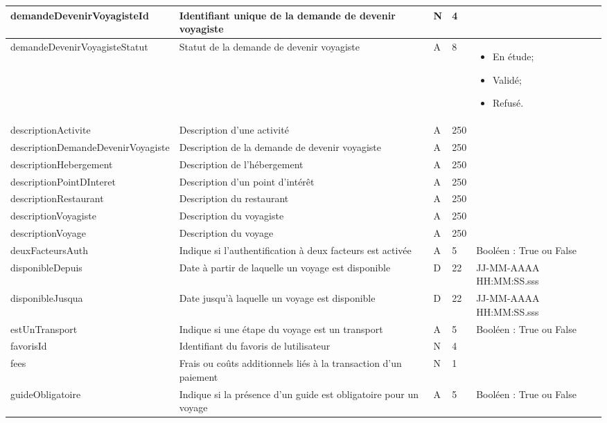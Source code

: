 \documentclass[12pt]{report}
\begin{document}
\begin{longtable}{|p{4cm}|p{4cm}|p{1cm}|p{1cm}|p{4cm}|}
				\hline
				demandeDevenirVoyagisteId & Identifiant unique de la demande de devenir voyagiste & N & 4 & \\						
				\hline
				demandeDevenirVoyagisteStatut & Statut de la demande de devenir voyagiste & A & 8 & \begin{itemize} \item En étude; \item Validé; \item Refusé. \end{itemize} \\						
				\hline
				descriptionActivite & Description d'une activité & A & 250 & \\						
				\hline
				descriptionDemandeDevenirVoyagiste & Description de la demande de devenir voyagiste & A & 250 & \\						
				\hline
				descriptionHebergement & Description de l'hébergement & A & 250 & \\						
				\hline
				descriptionPointDInteret & Description d'un point d'intérêt & A & 250 & \\						
				\hline
				descriptionRestaurant & Description du restaurant & A & 250 & \\						
				\hline
				descriptionVoyagiste & Description du voyagiste & A & 250 & \\						
				\hline
				descriptionVoyage & Description du voyage & A & 250 & \\						
				\hline
				deuxFacteursAuth & Indique si l'authentification à deux facteurs est activée & A & 5 & Booléen : True ou False \\						
				\hline
				disponibleDepuis & Date à partir de laquelle un voyage est disponible & D & 22 & JJ-MM-AAAA HH:MM:SS.sss \\						
				\hline
				disponibleJusqua & Date jusqu'à laquelle un voyage est disponible & D & 22 & JJ-MM-AAAA HH:MM:SS.sss \\						
				\hline
				estUnTransport & Indique si une étape du voyage est un transport & A & 5 & Booléen : True ou False \\						
				\hline
				favorisId & Identifiant du favoris de lutilisateur & N & 4 & \\
				\hline
				fees & Frais ou coûts additionnels liés à la transaction d'un paiement & N & 1 & \\						
				\hline
				guideObligatoire & Indique si la présence d'un guide est obligatoire pour un voyage & A & 5 & Booléen : True ou False \\						

\end{longtable}
\end{document}
